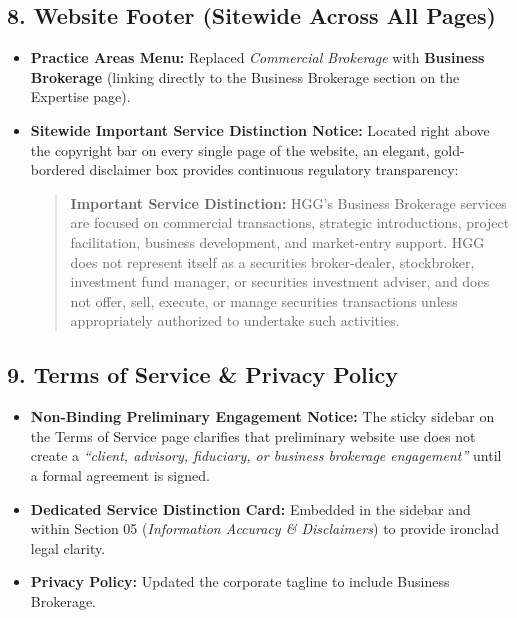 \documentclass[11pt,a4paper]{article}
\begin{document}
\subsection{8. Website Footer (Sitewide Across All Pages)}
\begin{itemize}[leftmargin=*]
    \item \textbf{Practice Areas Menu:} Replaced \textit{Commercial Brokerage} with \textbf{Business Brokerage} (linking directly to the Business Brokerage section on the Expertise page).
    \item \textbf{Sitewide Important Service Distinction Notice:} Located right above the copyright bar on every single page of the website, an elegant, gold-bordered disclaimer box provides continuous regulatory transparency:
    \begin{quote}
    \small
    \textbf{Important Service Distinction:} HGG's Business Brokerage services are focused on commercial transactions, strategic introductions, project facilitation, business development, and market-entry support. HGG does not represent itself as a securities broker-dealer, stockbroker, investment fund manager, or securities investment adviser, and does not offer, sell, execute, or manage securities transactions unless appropriately authorized to undertake such activities.
    \end{quote}
\end{itemize}

\subsection{9. Terms of Service \& Privacy Policy}
\begin{itemize}[leftmargin=*]
    \item \textbf{Non-Binding Preliminary Engagement Notice:} The sticky sidebar on the Terms of Service page clarifies that preliminary website use does not create a \textit{``client, advisory, fiduciary, or business brokerage engagement''} until a formal agreement is signed.
    \item \textbf{Dedicated Service Distinction Card:} Embedded in the sidebar and within Section 05 (\textit{Information Accuracy \& Disclaimers}) to provide ironclad legal clarity.
    \item \textbf{Privacy Policy:} Updated the corporate tagline to include Business Brokerage.
\end{itemize}

\newpage

\clearpage
\end{document}
